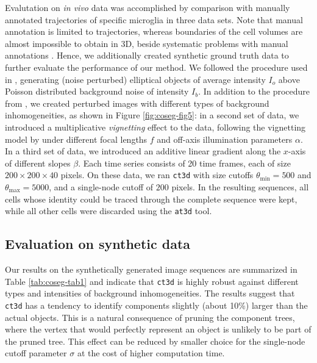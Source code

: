   Evalutation on \textit{in vivo} data was accomplished by comparison
  with manually annotated trajectories of specific microglia in three
  data sets. Note that manual annotation is limited to trajectories,
  whereas boundaries of the cell volumes are almost impossible to
  obtain in 3D, beside systematic problems with manual annotations
  \cite{Huth:10}. Hence, we additionally created synthetic ground
  truth data to further evaluate the performance of our method. We
  followed the procedure used in \cite{dufour2005segmenting}, generating (noise
  perturbed) elliptical objects of average intensity $I_o$ above
  Poisson distributed background noise of intensity $I_b$. In addition
  to the procedure from \cite{dufour2005segmenting}, we created perturbed images
  with different types of background inhomogeneities, as shown in
  Figure \ref{fig:coseg-fig5}: in a second set of data, we
  introduced a multiplicative \emph{vignetting} effect to the data,
  following the vignetting model by \cite{kang2000can} under different
  focal lengths $f$ and off-axis illumination parameters $\alpha$. In
  a third set of data, we introduced an additive linear gradient along
  the $x$-axis of different slopes $\beta$. Each time series consists
  of 20 time frames, each of size $200\times 200\times 40$ pixels. On
  these data, we ran \texttt{ct3d} with size cutoffs
  $\theta_{\min}=500$ and $\theta_{\max}=5000$, and a single-node
  cutoff of $200$ pixels. In the resulting sequences, all cells whose
  identity could be traced through the complete sequence were kept,
  while all other cells were discarded using the \texttt{at3d} tool.


\subsection{Evaluation on synthetic data}

Our results on the synthetically generated image sequences are
summarized in Table \ref{tab:coseg-tab1} and indicate that
\texttt{ct3d} is highly robust against different types and intensities
of background inhomogeneities. The results suggest that \texttt{ct3d}
has a tendency to identify components slightly (about 10\%) larger
than the actual objects. This is a natural consequence of pruning the
component trees, where the vertex that would perfectly represent an
object is unlikely to be part of the pruned tree. This effect can be
reduced by smaller choice for the single-node cutoff parameter
$\sigma$ at the cost of higher computation time.

